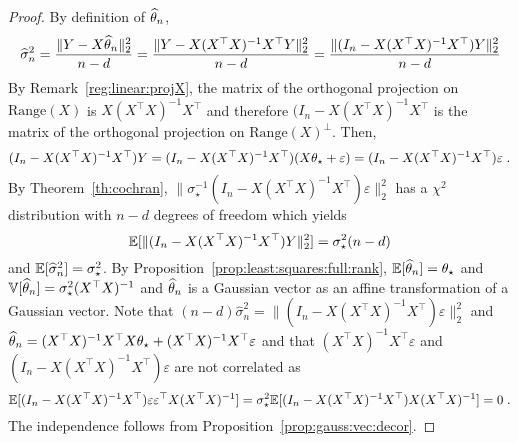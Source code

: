 \begin{proof}
By definition of $\widehat {\theta}_n$,
\[
\widehat \sigma^2_n =\frac{\|Y - X\widehat {\theta}_n \|_2^2}{n-d} = \frac{\|Y - X(X^\top X)^{-1}X^\top Y\|_2^2}{n-d} = \frac{\|(I_n - X(X^\top X)^{-1}X^\top )Y\|_2^2}{n-d}
\]
By Remark~\ref{reg:linear:projX}, the matrix of the orthogonal projection on $\mathrm{Range}(X)$ is $X(X^\top X)^{-1}X^\top$ and therefore $(I_n - X(X^\top X)^{-1}X^\top$ is the matrix  of the orthogonal projection on $\mathrm{Range}(X)^{\perp}$. Then,
\[
(I_n - X(X^\top X)^{-1}X^\top)Y = (I_n - X(X^\top X)^{-1}X^\top)(X\theta_\star + \varepsilon) = (I_n - X(X^\top X)^{-1}X^\top)\varepsilon\;.
\]
By Theorem~\ref{th:cochran}, $\|\sigma_\star^{-1}(I_n - X(X^\top X)^{-1}X^\top)\varepsilon\|_2^2$ has a $\chi^2$ distribution with $n-d$ degrees of freedom which yields
\[
\mathbb{E}[\|(I_n - X(X^\top X)^{-1}X^\top)Y\|_2^2] = \sigma_\star^2(n-d)
\]
and $\mathbb{E}[\widehat \sigma^2_n ] = \sigma_\star^2$. By Proposition~\ref{prop:least:squares:full:rank}, $\mathbb{E}[\widehat {\theta}_n] = \theta_\star$ and $\mathbb{V}[\widehat {\theta}_n] = \sigma_\star^2(X^\top X)^{-1}$ and $\widehat {\theta}_n$ is a Gaussian vector as an  affine transformation of a Gaussian vector. Note that $(n-d)\widehat \sigma^2_n = \|(I_n - X(X^\top X)^{-1}X^\top)\varepsilon\|_2^2$ and $\widehat {\theta}_n = (X^\top X)^{-1}X^\top X\theta_{\star} + (X^\top X)^{-1}X^\top\varepsilon$ and that $(X^\top X)^{-1}X^\top\varepsilon$ and $(I_n - X(X^\top X)^{-1}X^\top)\varepsilon$ are not correlated as 
\[
\mathbb{E}[(I_n - X(X^\top X)^{-1}X^\top)\varepsilon \varepsilon^\top X(X^\top X)^{-1}] = \sigma_\star^2\mathbb{E}[(I_n - X(X^\top X)^{-1}X^\top)X(X^\top X)^{-1}] = 0\;.
\]
The independence follows from Proposition~\ref{prop:gauss:vec:decor}.
\end{proof}

